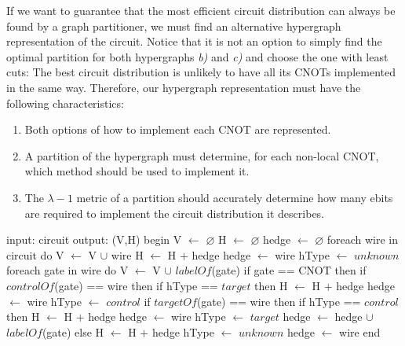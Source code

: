 If we want to guarantee that the most efficient circuit distribution can always be found by a graph partitioner, we must find an alternative hypergraph representation of the circuit. Notice that it is not an option to simply find the optimal partition for both hypergraphs \textit{b)} and \textit{c)} and choose the one with least cuts: The best circuit distribution is unlikely to have all its CNOTs implemented in the same way. Therefore, our hypergraph representation must have the following characteristics:
\begin{enumerate}
  \item Both options of how to implement each CNOT are represented.
  \item A partition of the hypergraph must determine, for each non-local CNOT, which method should be used to implement it.
  \item The \(\lambda-1\) metric of a partition should accurately determine how many ebits are required to implement the circuit distribution it describes.
\end{enumerate}

\begin{algorithm}[caption={Builds the hypergraph of a given circuit, without choosing whether CNOT gates are implemented through common control or common target. This algorithm runs in time \(O(g)\), where \(g\) is the number of gates in the input circuit.}, label={code:buildHypBothEnds}]
input: circuit
output: (V,H)
begin
  V $\gets$ $\varnothing$
  H $\gets$ $\varnothing$
  hedge $\gets$ $\varnothing$
  foreach wire in circuit do
    V $\gets$ V $\cup$ {wire}
    H $\gets$ H $+$ {hedge}
    hedge $\gets$ {wire}
    hType $\gets$ $unknown$
    foreach gate in wire do
      V $\gets$ V $\cup$ {$labelOf$(gate)}
      if gate == CNOT then
        if $controlOf$(gate) == wire then
          if hType == $target$ then
            H $\gets$ H $+$ {hedge}
            hedge $\gets$ {wire}
          hType $\gets$ $control$
        if $targetOf$(gate) == wire then
          if hType == $control$ then
            H $\gets$ H $+$ {hedge}
            hedge $\gets$ {wire}  
          hType $\gets$ $target$
        hedge $\gets$ hedge $\cup$ {$labelOf$(gate)}
      else
        H $\gets$ H $+$ {hedge}
        hType $\gets$ $unknown$
        hedge $\gets$ {wire}
end
\end{algorithm}



